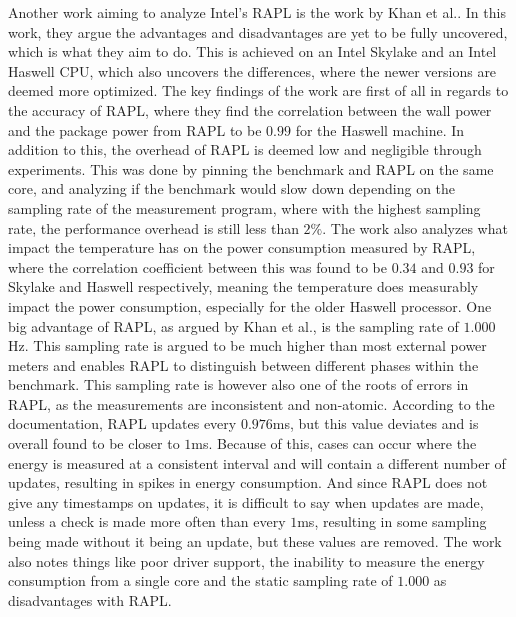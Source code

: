 Another work aiming to analyze Intel's RAPL is the work by Khan et al.\cite*[]{RAPL_in_action}. In this work, they argue the advantages and disadvantages are yet to be fully uncovered, which is what they aim to do. This is achieved on an Intel Skylake and an Intel Haswell CPU, which also uncovers the differences, where the newer versions are deemed more optimized. The key findings of the work are first of all in regards to the accuracy of RAPL, where they find the correlation between the wall power and the package power from RAPL to be $0.99$ for the Haswell machine. In addition to this, the overhead of RAPL is deemed low and negligible through experiments. This was done by pinning the benchmark and RAPL on the same core, and analyzing if the benchmark would slow down depending on the sampling rate of the measurement program, where with the highest sampling rate, the performance overhead is still less than $2\%$. The work also analyzes what impact the temperature has on the power consumption measured by RAPL, where the correlation coefficient between this was found to be $0.34$ and $0.93$ for Skylake and Haswell respectively, meaning the temperature does measurably impact the power consumption, especially for the older Haswell processor. One big advantage of RAPL, as argued by Khan et al.\cite*[]{RAPL_in_action}, is the sampling rate of $1.000$Hz. This sampling rate is argued to be much higher than most external power meters and enables RAPL to distinguish between different phases within the benchmark. This sampling rate is however also one of the roots of errors in RAPL, as the measurements are inconsistent and non-atomic. According to the documentation, RAPL updates every $0.976$ms, but this value deviates and is overall found to be closer to $1$ms. Because of this, cases can occur where the energy is measured at a consistent interval and will contain a different number of updates, resulting in spikes in energy consumption. And since RAPL does not give any timestamps on updates, it is difficult to say when updates are made, unless a check is made more often than every $1$ms, resulting in some sampling being made without it being an update, but these values are removed. The work\cite*[]{RAPL_in_action} also notes things like poor driver support, the inability to measure the energy consumption from a single core and the static sampling rate of $1.000$ as disadvantages with RAPL.



